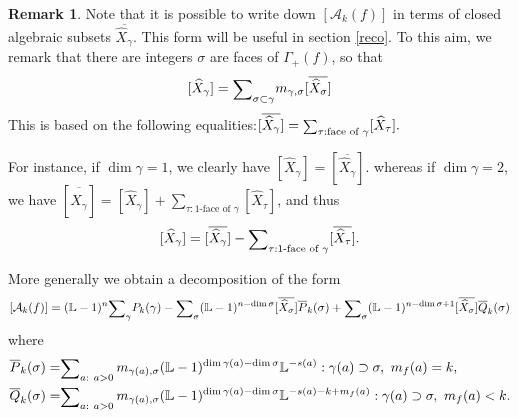 \documentclass[12pt,a4paper,leqno]{amsart}
\theoremstyle{definition}
\newtheorem{rem}[thm]{Remark}
\begin{document}
\begin{rem}\label{closed}
Note that it is possible to write down $[\mathcal A_k(f)]$ in terms of
closed algebraic subsets $\overline{\widehat{X}_\gamma}$. This form
will be useful in section \ref{reco}. To this aim, we remark that there are integers 
$\sigma$
are faces of $\Gamma_+(f)$, so that 
$$
[\widehat{X}_\gamma]
={\mathop{\textrm{\scriptsize $\mathop\sum$}}}_{\sigma\subset\gamma}m_{\gamma,\sigma}[\overline{\widehat{X}_\sigma}]
$$
This is based on the following
equalities:$[\overline{\widehat{X}_\gamma}]={\mathop{\textrm{\scriptsize $\mathop\sum$}}}_{\tau:
  \textrm{face of $\gamma$}}[\widehat{X}_\tau].$

For instance, if $\dim\gamma=1$, we clearly have
$[\widehat{X}_\gamma]=[\overline{\widehat{X}_\gamma}].$ whereas if  $\dim\gamma=2$, we have
$[\overline{\widehat{X}_\gamma}]=
[\widehat{X}_\gamma]+
\sum_{\tau: \textrm{1-face of $\gamma$}}[\widehat{X}_\tau]$,
and thus 
$$
[\widehat{X}_\gamma]=[\overline{\widehat{X}_\gamma}]-
{\mathop{\textrm{\scriptsize $\mathop\sum$}}}_{\tau: \textrm{1-face of $\gamma$}}[\overline{\widehat{X}_\tau}]. 
$$

More generally we obtain a decomposition of the form
$$[\mathcal A_k(f)]
=({\mathbb{L}}-1)^n{\mathop{\textrm{\scriptsize $\mathop\sum$}}}_{\gamma}P_k(\gamma)
-{\mathop{\textrm{\scriptsize $\mathop\sum$}}}_{\sigma}({\mathbb{L}}-1)^{n-\dim\sigma}
[\overline{\widehat{X}_\sigma}]\overline{P}_k(\sigma)
+{\mathop{\textrm{\scriptsize $\mathop\sum$}}}_{\sigma}({\mathbb{L}}-1)^{n-\dim\sigma+1}
[\overline{\widehat{X}_\sigma}]\overline{Q}_k(\sigma)$$
where 
\begin{align*}
\overline{P}_k(\sigma)=&
{\mathop{\textrm{\scriptsize $\mathop\sum$}}}_{a:\ a>0}\,
m_{\gamma(a),\sigma}({\mathbb{L}}-1)^{\dim\gamma(a)-\dim\sigma}
{\mathbb{L}}^{-s(a)}:\gamma(a)\supset\sigma,\ m_f(a)=k,\\
\overline{Q}_k(\sigma)=&
{\mathop{\textrm{\scriptsize $\mathop\sum$}}}_{a:\ a>0}\,
m_{\gamma(a),\sigma}({\mathbb{L}}-1)^{\dim\gamma(a)-\dim\sigma}
{\mathbb{L}}^{-s(a)-k+m_f(a)}:
\gamma(a)\supset\sigma,\ m_f(a)<k.
\end{align*}
\end{rem}
\end{document}
